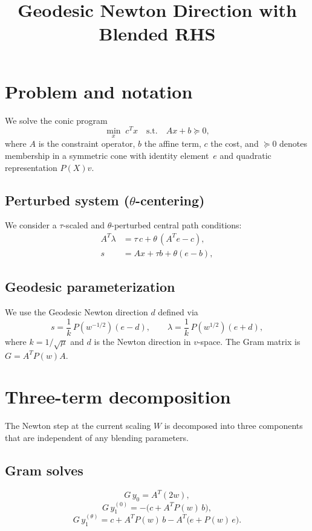 \documentclass{article}
\title{Geodesic Newton Direction with Blended RHS}
\author{}
\date{}
\begin{document}
\maketitle

\section{Problem and notation}

We solve the conic program
\[
  \min_{x}\; c^T x \quad \text{s.t.}\quad Ax + b \succeq 0,
\]
where $A$ is the constraint operator, $b$ the affine term, $c$ the
cost, and $\succeq 0$ denotes membership in a symmetric cone with
identity element~$e$ and quadratic representation $P(X)v$.


\subsection{Perturbed system ($\theta$-centering)}

We consider a $\tau$-scaled and $\theta$-perturbed
central path conditions:
\begin{align}
  A^T \lambda &= \tau\,c + \theta\,(A^T e-c), \label{eq:dual-theta} \\
  s &= Ax + \tau b + \theta(e-b)  , \label{eq:primal-theta} 
\end{align}

\subsection{Geodesic parameterization}
We use the Geodesic Newton direction $d$ defined via
\[
  s = \frac{1}{k}\,P(w^{-1/2})(e - d), \qquad
  \lambda = \frac{1}{k}\,P(w^{1/2})(e + d),
\]
where $k = 1/\sqrt{\mu}$ and $d$ is the Newton direction in $v$-space.
The Gram matrix is $G = A^T P(w) A$.

\section{Three-term decomposition}

The Newton step at the current scaling $W$ is decomposed into three
components that are independent of any blending parameters.

\subsection{Gram solves}

\[
  G\,y_0 = A^T(2w),
\]
\[
  G\,y_1^{(0)} = -\bigl(c + A^T P(w)\,b\bigr),
\]
\[
  G\,y_1^{(\theta)} = c + A^T P(w)\,b - A^T\bigl(e + P(w)\,e\bigr).
\]
\end{document}
